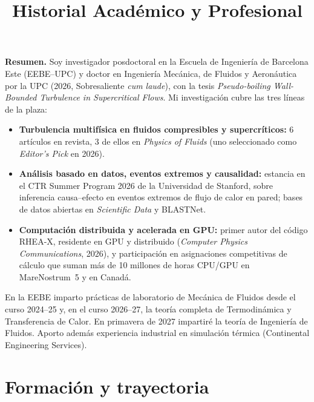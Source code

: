 \documentclass[11pt]{article}
\title{\textbf{Historial Acad\'emico y Profesional}}
\author{\Large \CandName}
\date{}
\begin{document}
\maketitle
\thispagestyle{plain}
\vspace{0.5cm}
\begin{center}\postdata\end{center}

\vspace{0.8cm}
\noindent\textbf{Resumen.}
Soy investigador posdoctoral en la Escuela de Ingenier\'ia de Barcelona Este (EEBE--UPC)
y doctor en Ingenier\'ia Mec\'anica, de Fluidos y Aeron\'autica por la UPC (2026,
Sobresaliente \emph{cum laude}), con la tesis \emph{Pseudo-boiling Wall-Bounded
Turbulence in Supercritical Flows}. Mi investigaci\'on cubre las tres l\'ineas de la plaza:
\begin{itemize}
\item \textbf{Turbulencia multif\'isica en fluidos compresibles y supercr\'iticos:} 6
art\'iculos en revista, 3 de ellos en \emph{Physics of Fluids} (uno seleccionado como
\emph{Editor's Pick} en 2026).
\item \textbf{An\'alisis basado en datos, eventos extremos y causalidad:} estancia en el
CTR Summer Program 2026 de la Universidad de Stanford, sobre inferencia causa--efecto en
eventos extremos de flujo de calor en pared; bases de datos abiertas en
\emph{Scientific Data} y BLASTNet.
\item \textbf{Computaci\'on distribuida y acelerada en GPU:} primer autor del c\'odigo
RHEA-X, residente en GPU y distribuido (\emph{Computer Physics Communications}, 2026), y
participaci\'on en asignaciones competitivas de c\'alculo que suman m\'as de 10 millones de
horas CPU/GPU en MareNostrum~5 y en Canad\'a.
\end{itemize}
En la EEBE imparto pr\'acticas de laboratorio de Mec\'anica de Fluidos desde el curso
2024--25 y, en el curso 2026--27, la teor\'ia completa de Termodin\'amica y Transferencia
de Calor. En primavera de 2027 impartir\'e la teor\'ia de Ingenier\'ia de Fluidos. Aporto
adem\'as experiencia industrial en simulaci\'on t\'ermica (Continental Engineering Services).

\newpage
\tableofcontents
\newpage

\section{Formaci\'on y trayectoria}
\end{document}
